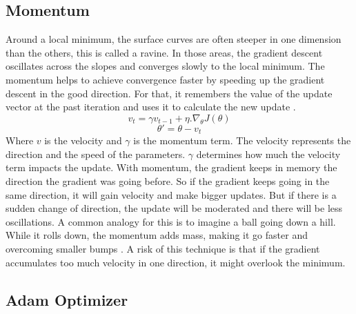 \subsection{Momentum}
Around a local minimum, the surface curves are often steeper in one dimension than the others, this is called a ravine. In those areas, the gradient descent oscillates across the slopes and converges slowly to the local minimum. The momentum helps to achieve convergence faster by speeding up the gradient descent in the good direction. For that, it remembers the value of the update vector at the past iteration and uses it to calculate the new update \cite{optimgrad}. \[ v_t = \gamma v_{t-1} + \eta . \nabla_\theta J(\theta)  \] \[\theta' = \theta - v_t\]
Where \(v\) is the velocity and \(\gamma\) is the momentum term. The velocity represents the direction and the speed of the parameters. \(\gamma\) determines how much the velocity term impacts the update. With momentum, the gradient keeps in memory the direction the gradient was going before. So if the gradient keeps going in the same direction, it will gain velocity and make bigger updates. But if there is a sudden change of direction, the update will be moderated and there will be less oscillations. A common analogy for this is to imagine a ball going down a hill. While it rolls down, the momentum adds mass, making it go faster and overcoming smaller bumps \cite{optimgrad}. A risk of this technique is that if the gradient accumulates too much velocity in one direction, it might overlook the minimum. 

\subsection{Adam Optimizer}


